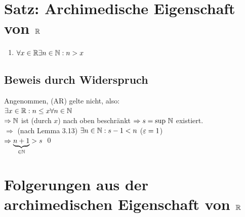 \section{\texorpdfstring{Satz: Archimedische Eigenschaft von $\mathbb{R}$}{Satz: Archimedische Eigenschaft von \R}}\label{3.14}
\begin{enumerate}[label=(AR)]
\item $\forall x \in \mathbb{R} \exists n \in \mathbb{N} : n > x$\\
\end{enumerate}

\subsection*{Beweis durch Widerspruch}
Angenommen, (AR)  gelte nicht, also:\\
$\exists x \in \mathbb{R} : n \le x \forall n \in \mathbb{N}$\\
$\Rightarrow \mathbb{N}$ ist (durch $x$) nach oben beschränkt $\Rightarrow s = \text{sup } \mathbb{N}$ existiert.\\
$\Rightarrow$ (nach Lemma 3.13) $\exists n \in \mathbb{N} : s-1 < n$ ($\varepsilon = 1$)\\
$\Rightarrow \underbrace{n+1}_{\in \mathbb{N}} > s$ \wspruch \qed

\section{\texorpdfstring{Folgerungen aus der archimedischen Eigenschaft von $\mathbb{R}$}{Folgerungen aus der archimedischen Eigenschaft von \R}}\label{3.15}

